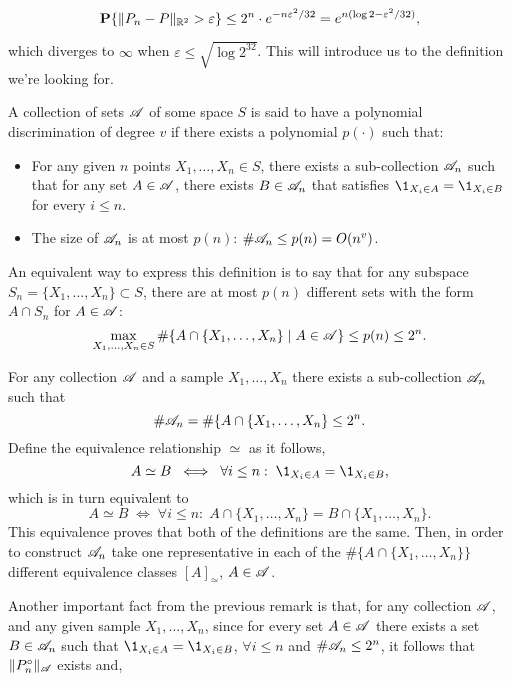 \begin{equation}
    \label{vc:4}
    \P\{\|P_n-P\|_{\mathcal{\R}^2} > \varepsilon\} \leq 2^n \cdot e^{-n \varepsilon^2 / 32} = e^{n(\log 2-\varepsilon^2/32)},
\end{equation}

which diverges to $\infty$ when $\varepsilon \leq \sqrt{\log 2^{32}}$. This will introduce us to the definition we're looking for.

\begin{definition}
    A collection of sets $\AA$ of some space $S$ is said to have a polynomial discrimination of degree $v$ if there exists a polynomial $p(\cdot)$ such that:
    \begin{itemize}
        \item For any given $n$ points $X_1,\ldots, X_n \in S$, there exists a sub-collection $\AA_n$ such that for any set $A \in \AA$, there exists $B \in \AA_n$ that satisfies $\1_{X_i \in A} = \1_{X_i \in B}$ for every $i \leq n$.
        \item The size of $\AA_n$ is at most $p(n)$: $\#\AA_n \leq p(n) = O(n^v)$.
    \end{itemize}
    An equivalent way to express this definition is to say that for any subspace $S_n = \{X_1,\ldots, X_n\} \subset S$, there are at most $p(n)$ different sets with the form $A\cap S_n$ for $A\in\AA$:
    \[ \max_{X_1,\ldots, X_n \in S} \#\{A \cap \{X_1,\ldots, X_n\} \;|\; A \in \AA\} \leq p(n) \leq 2^n.\] 
\end{definition}
\begin{remark}
    For any collection $\AA$ and a sample $X_1,\ldots, X_n$ there exists a sub-collection $\AA_n$ such that
    \[ \#\AA_n = \# \{A \cap \{X_1,\ldots, X_n\} \leq 2^n. \] 
    Define the equivalence relationship $\simeq$ as it follows,
    \[ A \simeq B \; \iff \; \forall i\leq n : \; \1_{X_i \in A} = \1_{X_i \in B}, \] 
    which is in turn equivalent to
    \[ A \simeq B \; \iff \; \forall i\leq n : \; A \cap \{X_1,\ldots,X_n\} =  B \cap \{X_1,\ldots,X_n\}. \]
    This equivalence proves that both of the definitions are the same. Then, in order to construct $\AA_n$ take one representative in each of the $\# \{A \cap \{X_1,\ldots, X_n\}\}$ different equivalence classes ${[A]}_\simeq$, $A \in \AA$.
\end{remark}
Another important fact from the previous remark is that, for any collection $\AA$, and any given sample $X_1, \ldots, X_n$, since for every set $A \in \AA$ there exists a set $B \in \AA_n$ such that $\1_{X_i \in A} = \1_{X_i \in B}$, $\forall i\leq n$ and $\#\AA_n \leq 2^n$, it follows that $\|P_n^\circ\|_\AA$ exists and,
